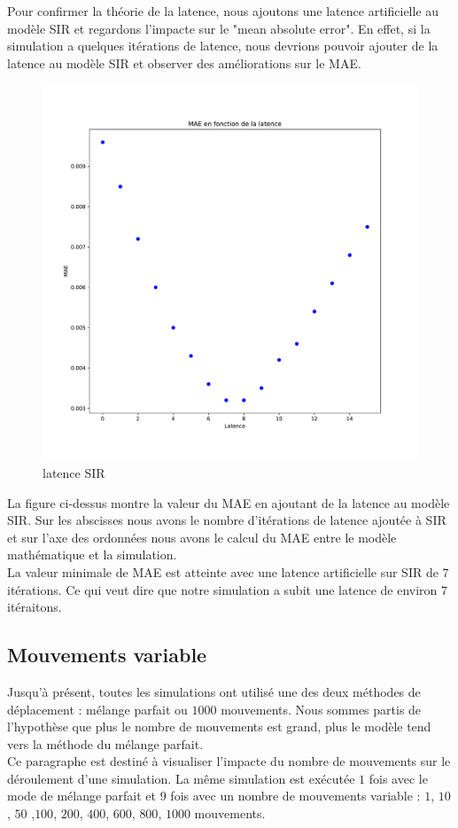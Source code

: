 Pour confirmer la théorie de la latence, nous ajoutons une latence artificielle au modèle SIR et regardons l'impacte sur le "mean absolute error". En effet, si la simulation a quelques itérations de latence, nous devrions pouvoir ajouter de la latence au modèle SIR et observer des améliorations sur le MAE.\\

\begin{figure}
    \centering
	\captionsetup{justification=centering}
	\includegraphics[width=.5\textwidth]{Images/SIR_latence_8_5.pdf}
	\caption{latence SIR}
\end{figure}

La figure ci-dessus montre la valeur du MAE en ajoutant de la latence au modèle SIR. Sur les abscisses nous avons le nombre d'itérations de latence ajoutée à SIR et sur l'axe des ordonnées nous avons le calcul du MAE entre le modèle mathématique et la simulation.\\

La valeur minimale de MAE est atteinte avec une latence artificielle sur SIR de $7$ itérations. Ce qui veut dire que notre simulation a subit une latence de environ $7$ itéraitons.

\newpage

\subsection{Mouvements variable}

Jusqu'à présent, toutes les simulations ont utilisé une des deux méthodes de déplacement : mélange parfait ou $1000$ mouvements. Nous sommes partis de l'hypothèse que plus le nombre de mouvements est grand, plus le modèle tend vers la méthode du mélange parfait.\\

Ce paragraphe est destiné à visualiser l'impacte du nombre de mouvements sur le déroulement d'une simulation. La même simulation est exécutée $1$ fois avec le mode de mélange parfait et $9$ fois avec un nombre de mouvements variable : $1$, $10$, $50$ ,$100$, $200$, $400$, $600$, $800$, $1000$ mouvements.

